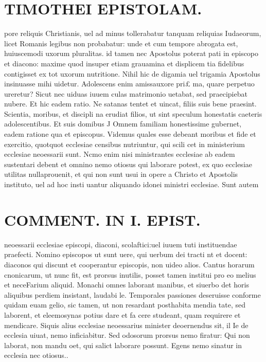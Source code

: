 \documentclass{article}
\begin{document}
\begin{pages}
\section*{TIMOTHEI EPISTOLAM. }
\marginpar{[ p.85 ]}\pstart pore reliquis Christianis, uel ad minus tollerabatur tanquam reliquias Iudaeorum, licet Romanis legibus non probabatur: unde et cum tempore abrogata est, huiuscemodi uxorum pluralitas. id tamen nec Apostolus poterat pati in episcopo et diacono: maxime quod insuper etiam grauamina et displicem tia fidelibus contigisset ex tot uxorum nutritione. Nihil hic de digamia uel trigamia Apostolus insinuasse mihi uidetur. Adolescens enim amissauxore pri£ ma, quare perpetuo ureretur? Sicut nec uiduas iuuem culas matrimonio uetabat, sed praecipiebat nubere. Et hic eadem ratio. Ne satanas tentet et uincat, filiis suis bene praesint. Scientia, moribus, et discipli na erudiat filios, ut sint speculum honestatis caeteris adolescentibus.  \pend\pstart Et suis domibus J Omnem familiam honestissime gubernet, eadem ratione qua et episcopus. Videmus quales esse debeant moribus et fide et exercitio, quotquot ecclesiae censibus nutriuntur, qui scili cet in ministerium ecclesiae neoessarii sunt. Ncmo enim nisi ministrantes ecclesiae ab eadem sustentari debent et omnino nemo otiosus qui laborare potest, ex quo ecclesiae utilitas nullaprouenit, et qui non sunt usui in opere a Christo et Apostolis instituto, uel ad hoc insti uantur aliquando idonei ministri ecclesiae. Sunt autem  \pend
\section*{COMMENT. IN I. EPIST. }
\marginpar{[ p.86 ]}\pstart neoessarii ecclesiae episcopi, diaconi, scolaftici:uel iuuem tuti instituendae praefecti. Nomino episcopos ut sunt uere, qui uerbum dei tracti nt et docent: diaconos qui discunt et cooperantur episcopis, non uideo alios. Cantus horarum cnonicarum, ut nunc fit, est prorsus inutilis, posset tamen institui pro eo melius et neceFarium aliquid. Monachi omnes laborant manibus, et siuerbo det horis aliquibus perdiem insistant, laudabi le. Temporales passiones deseruisse conforme quidam euam gelio, sic tamen, ut non resardant posthabita mendia tate, sed laborent, et eleemosynas potius dare et fa cere studeant, quam requirere et mendicare. Siquis alius ecclesiae neoessarius minister deoernendus sit, il Ie de ecclesia uiuat, nemo inficiabitur. Sed odosorum prorsus nemo firatur: Qui non laborat, non mandu oet, qui salict laborare possunt. Egens nemo sinatur in ecclesia nec otiosus..  \pend
{}
{}

\end{pages}
\end{document}
